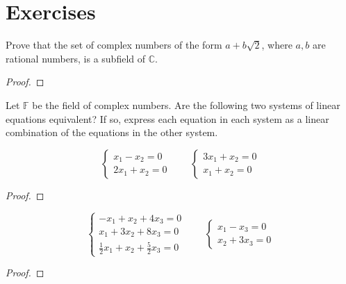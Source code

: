\section*{Exercises}

\begin{exercise}
    Prove that the set of complex numbers of the form $a + b\sqrt{2}$, where $a, b$ are rational numbers, is a subfield of $\mathbb{C}$.
\end{exercise}

\begin{proof}
\end{proof}

Let $\mathbb{F}$ be the field of complex numbers. Are the following two systems of linear equations equivalent? If so, express each equation in each system as a linear combination of the equations in the other system.

\begin{exercise}
    \[
        \begin{cases}
            x_{1} - x_{2} = 0 \\
            2x_{1} + x_{2} = 0
        \end{cases}
        \qquad
        \begin{cases}
            3x_{1} + x_{2} = 0 \\
            x_{1} + x_{2} = 0
        \end{cases}
    \]
\end{exercise}

\begin{proof}
\end{proof}

\begin{exercise}
    \[
        \begin{cases}
            -x_{1} + x_{2} + 4x_{3} = 0 \\
            x_{1} + 3x_{2} + 8x_{3} = 0 \\
            \frac{1}{2}x_{1} + x_{2} + \frac{5}{2}x_{3} = 0
        \end{cases}
        \qquad
        \begin{cases}
            x_{1} - x_{3} = 0 \\
            x_{2} + 3x_{3} = 0
        \end{cases}
    \]
\end{exercise}

\begin{proof}
\end{proof}

